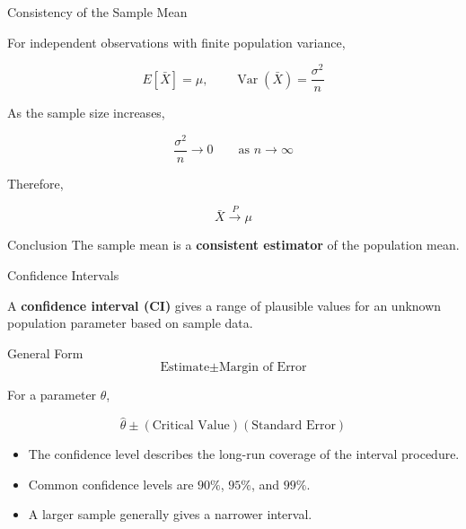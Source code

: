 \documentclass{beamer}
\begin{document}

\begin{frame}{Consistency of the Sample Mean}

For independent observations with finite population variance,

\[
E[\bar X]=\mu,
\qquad
\operatorname{Var}(\bar X)=\frac{\sigma^2}{n}
\]

As the sample size increases,

\[
\frac{\sigma^2}{n}\longrightarrow0
\qquad\text{as }n\longrightarrow\infty
\]

Therefore,

\[
\boxed{
\bar X\xrightarrow{P}\mu
}
\]

\begin{block}{Conclusion}
The sample mean is a \textbf{consistent estimator} of the
population mean.
\end{block}

\end{frame}


\begin{frame}{Confidence Intervals}

A \textbf{confidence interval (CI)} gives a range of plausible
values for an unknown population parameter based on sample data.

\begin{block}{General Form}
\[
\boxed{
\text{Estimate}
\pm
\text{Margin of Error}
}
\]
\end{block}

For a parameter $\theta$,

\[
\boxed{
\hat{\theta}\pm
(\text{Critical Value})(\text{Standard Error})
}
\]

\begin{itemize}
    \item The confidence level describes the long-run coverage
          of the interval procedure.
    \item Common confidence levels are $90\%$, $95\%$, and $99\%$.
    \item A larger sample generally gives a narrower interval.
\end{itemize}

\end{frame}
\end{document}
